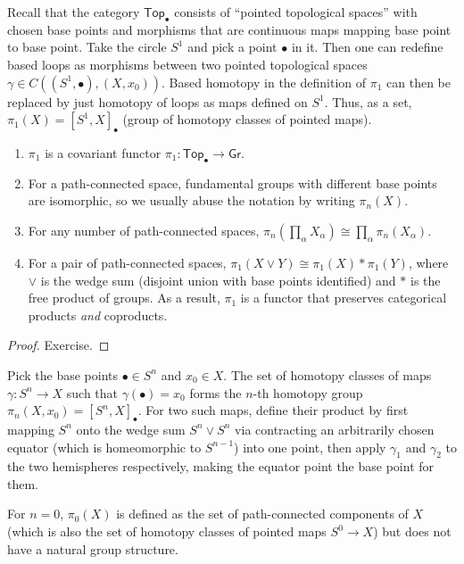 \documentclass[english,letterpaper]{article}%
\numberwithin{equation}{section}
\numberwithin{figure}{section}
\numberwithin{table}{section}
\theoremstyle{definition}
\theoremstyle{definition}
\theoremstyle{definition}
\theoremstyle{plain}
\theoremstyle{plain}
\theoremstyle{plain}
\theoremstyle{plain}
\theoremstyle{remark}
\theoremstyle{remark}
\begin{document}
\begin{defn}
Recall that the category $\mathsf{Top}_\bullet$ consists of ``pointed topological spaces'' with chosen base points and morphisms that are continuous maps mapping base point to base point. Take the circle $S^1$ and pick a point $\bullet$ in it. Then one can redefine based loops as morphisms between two pointed topological spaces $\gamma\in C((S^1,\bullet),(X,x_0))$. Based homotopy in the definition of $\pi_1$ can then be replaced by just homotopy of loops as maps defined on $S^1$.   Thus, as a set, $\pi_1(X)=[S^1,X]_\bullet$ (group of homotopy classes of pointed maps).
\end{defn}
\begin{prop}\label{prop computing pi1}
\begin{enumerate}
    \item $\pi_1$ is a covariant functor $\pi_1:\mathsf{Top}_\bullet\to \mathsf{Gr}$.
    \item For a path-connected space, fundamental groups with different base points are isomorphic, so we usually abuse the notation by writing $\pi_n(X)$.
    \item For any number of path-connected spaces, $\pi_n(\prod_\alpha X_\alpha)\cong \prod_\alpha \pi_n(X_\alpha)$.
    \item For a pair of path-connected spaces, $\pi_1(X\lor Y)\cong \pi_1(X)\ast \pi_1(Y)$, where $\lor$ is the wedge sum (disjoint union with base points identified) and $\ast$ is the free product of groups. As a result, $\pi_1$ is a functor that preserves categorical products \emph{and} coproducts.
\end{enumerate}
\end{prop}
\begin{proof}
Exercise.
\end{proof}
\begin{defn}
Pick the base points $\bullet\in S^n$ and $x_0\in X$. The set of homotopy classes of maps $\gamma:S^n\to X$ such that $\gamma(\bullet)=x_0$ forms the $n$-th homotopy group $\pi_n(X,x_0)=[S^n,X]_\bullet$. For two such maps, define their product by first mapping $S^n$ onto the wedge sum $S^n\lor S^n$ via contracting an arbitrarily chosen equator (which is homeomorphic to $S^{n-1}$) into one point, then apply $\gamma_1$ and $\gamma_2$ to the two hemispheres respectively, making the equator point the base point for them.

For $n=0$, $\pi_0(X)$ is defined as the set of path-connected components of $X$ (which is also the set of homotopy classes of pointed maps $S^0\to X$) but does not have a natural group structure.
\end{defn}
\end{document}
